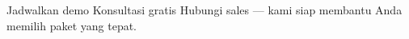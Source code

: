 \documentclass[a4paper]{article}
\begin{document}
\vspace{8pt}

\begin{center}
{\fontsize{9}{13}\selectfont\color{TextLight}
Jadwalkan demo \enspace\textcolor{BluePrimary}{\textbullet}\enspace Konsultasi gratis \enspace\textcolor{BluePrimary}{\textbullet}\enspace Hubungi sales --- kami siap membantu Anda memilih paket yang tepat.}
\end{center}

\pagestyle{empty}
\restoregeometry
\end{document}
